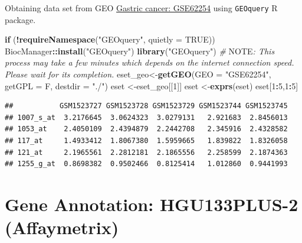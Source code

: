 \documentclass[
  12pt,
]{book}
\newenvironment{Shaded}{\begin{snugshade}}{\end{snugshade}}
\newcommand{\AlertTok}[1]{\textcolor[rgb]{0.94,0.16,0.16}{#1}}
\newcommand{\AttributeTok}[1]{\textcolor[rgb]{0.13,0.29,0.53}{#1}}
\newcommand{\CommentTok}[1]{\textcolor[rgb]{0.56,0.35,0.01}{\textit{#1}}}
\newcommand{\ConstantTok}[1]{\textcolor[rgb]{0.56,0.35,0.01}{#1}}
\newcommand{\ControlFlowTok}[1]{\textcolor[rgb]{0.13,0.29,0.53}{\textbf{#1}}}
\newcommand{\DecValTok}[1]{\textcolor[rgb]{0.00,0.00,0.81}{#1}}
\newcommand{\FunctionTok}[1]{\textcolor[rgb]{0.13,0.29,0.53}{\textbf{#1}}}
\newcommand{\NormalTok}[1]{#1}
\newcommand{\OtherTok}[1]{\textcolor[rgb]{0.56,0.35,0.01}{#1}}
\newcommand{\SpecialCharTok}[1]{\textcolor[rgb]{0.81,0.36,0.00}{\textbf{#1}}}
\newcommand{\StringTok}[1]{\textcolor[rgb]{0.31,0.60,0.02}{#1}}
\begin{document}
Obtaining data set from GEO \href{https://pubmed.ncbi.nlm.nih.gov/25894828/}{Gastric cancer: GSE62254} using \texttt{GEOquery} R package.

\begin{Shaded}
\begin{Highlighting}[]
\ControlFlowTok{if}\NormalTok{ (}\SpecialCharTok{!}\FunctionTok{requireNamespace}\NormalTok{(}\StringTok{"GEOquery"}\NormalTok{, }\AttributeTok{quietly =} \ConstantTok{TRUE}\NormalTok{))  BiocManager}\SpecialCharTok{::}\FunctionTok{install}\NormalTok{(}\StringTok{"GEOquery"}\NormalTok{)}
\FunctionTok{library}\NormalTok{(}\StringTok{"GEOquery"}\NormalTok{)}
\CommentTok{\# }\AlertTok{NOTE}\CommentTok{: This process may take a few minutes which depends on the internet connection speed. Please wait for its completion.}
\NormalTok{eset\_geo}\OtherTok{\textless{}{-}}\FunctionTok{getGEO}\NormalTok{(}\AttributeTok{GEO     =} \StringTok{"GSE62254"}\NormalTok{, }\AttributeTok{getGPL  =}\NormalTok{ F, }\AttributeTok{destdir =} \StringTok{"./"}\NormalTok{)}
\NormalTok{eset    }\OtherTok{\textless{}{-}}\NormalTok{eset\_geo[[}\DecValTok{1}\NormalTok{]]}
\NormalTok{eset    }\OtherTok{\textless{}{-}}\FunctionTok{exprs}\NormalTok{(eset)}
\NormalTok{eset[}\DecValTok{1}\SpecialCharTok{:}\DecValTok{5}\NormalTok{,}\DecValTok{1}\SpecialCharTok{:}\DecValTok{5}\NormalTok{]}
\end{Highlighting}
\end{Shaded}

\begin{verbatim}
##           GSM1523727 GSM1523728 GSM1523729 GSM1523744 GSM1523745
## 1007_s_at  3.2176645  3.0624323  3.0279131   2.921683  2.8456013
## 1053_at    2.4050109  2.4394879  2.2442708   2.345916  2.4328582
## 117_at     1.4933412  1.8067380  1.5959665   1.839822  1.8326058
## 121_at     2.1965561  2.2812181  2.1865556   2.258599  2.1874363
## 1255_g_at  0.8698382  0.9502466  0.8125414   1.012860  0.9441993
\end{verbatim}

\hypertarget{gene-annotation-hgu133plus-2-affaymetrix}{%
\section{Gene Annotation: HGU133PLUS-2 (Affaymetrix)}\label{gene-annotation-hgu133plus-2-affaymetrix}}
\end{document}
